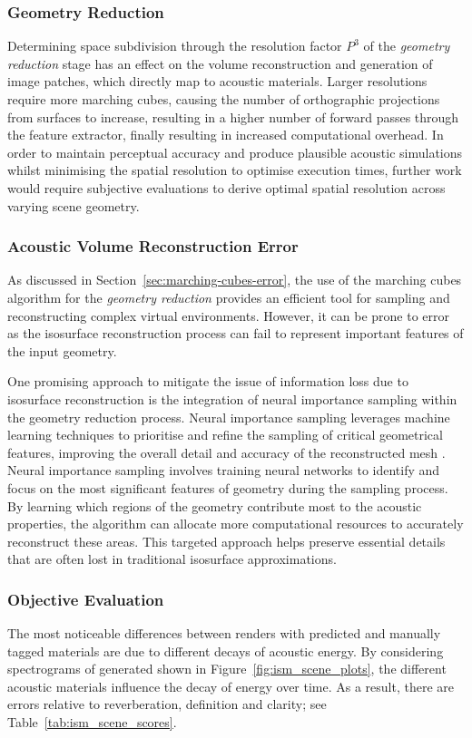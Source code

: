 \subsubsection{Geometry Reduction}
Determining space subdivision through the resolution factor $P^3$ of the \emph{geometry reduction} stage has an effect on the volume reconstruction and generation of image patches, which directly map to acoustic materials. Larger resolutions require more marching cubes, causing the number of orthographic projections from surfaces to increase, resulting in a higher number of forward passes through the feature extractor, finally resulting in increased computational overhead. In order to maintain perceptual accuracy and produce plausible acoustic simulations whilst minimising the spatial resolution to optimise execution times, further work would require subjective evaluations to derive optimal spatial resolution across varying scene geometry. \par

\subsubsection{Acoustic Volume Reconstruction Error}
As discussed in Section~\ref{sec:marching-cubes-error}, the use of the marching cubes algorithm for the \emph{geometry reduction} provides an efficient tool for sampling and reconstructing complex virtual environments. However, it can be prone to error as the isosurface reconstruction process can fail to represent important features of the input geometry.\par
One promising approach to mitigate the issue of information loss due to isosurface reconstruction is the integration of neural importance sampling within the geometry reduction process. Neural importance sampling leverages machine learning techniques to prioritise and refine the sampling of critical geometrical features, improving the overall detail and accuracy of the reconstructed mesh \citep{muller2019neural}. Neural importance sampling involves training neural networks to identify and focus on the most significant features of geometry during the sampling process. By learning which regions of the geometry contribute most to the acoustic properties, the algorithm can allocate more computational resources to accurately reconstruct these areas. This targeted approach helps preserve essential details that are often lost in traditional isosurface approximations.


\subsubsection{Objective Evaluation}
The most noticeable differences between renders with predicted and manually tagged materials are due to different decays of acoustic energy. By considering spectrograms of generated  shown in Figure~\ref{fig:ism_scene_plots}, the different acoustic materials influence the decay of energy over time. As a result, there are errors relative to reverberation, definition and clarity; see Table~\ref{tab:ism_scene_scores}. \par

